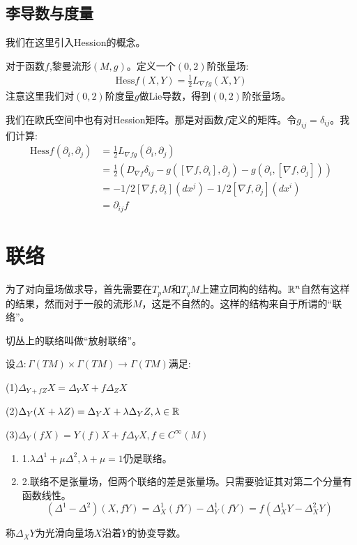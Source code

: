 \subsection{李导数与度量}
我们在这里引入Hession的概念。
\begin{definition}
    对于函数$f$,黎曼流形$(M,g)$。定义一个$(0,2)$阶张量场:
    \begin{align*}
        \mathrm{Hess}f(X,Y)=\frac{1}{2}L_{\nabla f g}(X,Y)
    \end{align*}
    注意这里我们对$(0,2)$阶度量$g$做Lie导数，得到$(0,2)$阶张量场。
\end{definition}

我们在欧氏空间中也有对Hession矩阵。那是对函数$f$定义的矩阵。令$g_{ij}=\delta_{ij}$。我们计算:
\begin{align*}
    \mathrm{Hess}f(\partial_i,\partial_j)&=\frac{1}{2}L_{\nabla f g}(\partial_i,\partial_j)\\&=\frac{1}{2}(D_{\nabla f}\delta_{ij}-g([\nabla f,\partial_i],\partial_j)-g(\partial_i,[\nabla f,\partial_j]))\\&=-1/2[\nabla f,\partial_i](dx^j)-1/2[\nabla f,\partial_j](dx^i)\\&=\partial_{ij}f
\end{align*}
\section{联络}
为了对向量场做求导，首先需要在$T_p M$和$T_q M$上建立同构的结构。$\mathbb{R}^n$自然有这样的结果，然而对于一般的流形$M$，这是不自然的。这样的结构来自于所谓的“联络”。

切丛上的联络叫做“放射联络”。

\begin{definition}[放射联络]
    设$\Delta: \Gamma(TM) \times \Gamma(TM) \to \Gamma(TM)$满足:

    (1)$\Delta_{Y+fZ}X =\Delta_Y X+f\Delta_Z X$

    (2)$\Delta_Y (X+\lambda Z)=\Delta_Y X+\lambda \Delta_Y Z,\lambda \in \mathbb{R}$

    (3)$\Delta_Y (fX)=Y(f)X+f\Delta_Y X, f \in C^{\infty}(M)$
\end{definition}
\begin{proposition}[基本性质]
    \begin{enumerate}
        \item 1.$\lambda \Delta^1 +\mu \Delta^2,\lambda+\mu=1$仍是联络。
        \item 2.联络不是张量场，但两个联络的差是张量场。只需要验证其对第二个分量有函数线性。
        $$
        (\Delta^1 -\Delta^2)(X,fY)=\Delta_X^1(fY)-\Delta_Y^1(fY)=f(\Delta_X^1 Y-\Delta_X^2 Y)
        $$
    \end{enumerate}
    \end{proposition}
    \begin{definition}
        称$\Delta_X Y$为光滑向量场$X$沿着$Y$的协变导数。
    \end{definition}

